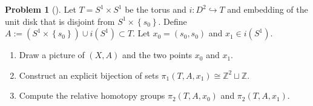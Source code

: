 \documentclass[reqno]{amsart}
\theoremstyle{definition}
\newtheorem{problem}[theorem]{Problem}
\theoremstyle{remark}
\begin{document}
    \begin{problem}[]
        Let $T = S^{1} \times S^{1}$ be the torus and
        $i \colon D^2 \hookrightarrow T$ and embedding of
        the unit disk that is disjoint from $S^{1}\times 
        \left\{ s_0 \right\} $. Define
        $A := \left( S^{1} \times \left\{ s_0 \right\}  \right) 
        \cup i \left( S^{1} \right) \subset T$.
        Let $x_0 = \left( s_0,s_0 \right) $ and
        $x_1 \in i \left( S^{1} \right) $.
        \begin{enumerate}
            \item Draw a picture of $\left( X,A \right) $ 
                and the two points $x_0$ and $x_1$.
            \item Construct an explicit bijection of
                sets
                $\pi_1 \left( T,A,x_1 \right) \cong
                \mathbb{Z}^2 \sqcup \mathbb{Z}$.
            \item Compute the relative homotopy groups
                $\pi_2 \left( T,A,x_0 \right) $ and
                $\pi_2 \left( T,A,x_1 \right) $.
        \end{enumerate}
    \end{problem}
\end{document}

